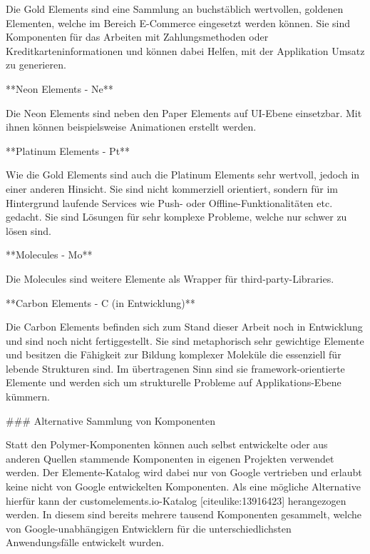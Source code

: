 Die Gold Elements sind eine Sammlung an buchstäblich wertvollen, goldenen Elementen, welche im Bereich E-Commerce eingesetzt werden können. Sie sind Komponenten für das Arbeiten mit Zahlungsmethoden oder Kreditkarteninformationen und können dabei Helfen, mit der Applikation Umsatz zu generieren.


**Neon Elements - Ne**

Die Neon Elements sind neben den Paper Elements auf UI-Ebene einsetzbar. Mit ihnen können beispielsweise Animationen erstellt werden.


**Platinum Elements - Pt**

Wie die Gold Elements sind auch die Platinum Elements sehr wertvoll, jedoch in einer anderen Hinsicht. Sie sind nicht kommerziell orientiert, sondern für im Hintergrund laufende Services wie Push- oder Offline-Funktionalitäten etc. gedacht. Sie sind Lösungen für sehr komplexe Probleme, welche nur schwer zu lösen sind.


**Molecules - Mo**

Die Molecules sind weitere Elemente als Wrapper für third-party-Libraries.


**Carbon Elements - C (in Entwicklung)**

Die Carbon Elements befinden sich zum Stand dieser Arbeit noch in Entwicklung und sind noch nicht fertiggestellt. Sie sind metaphorisch sehr gewichtige Elemente und besitzen die Fähigkeit zur Bildung komplexer Moleküle die essenziell für lebende Strukturen sind. Im übertragenen Sinn sind sie framework-orientierte Elemente und werden sich um strukturelle Probleme auf Applikations-Ebene kümmern.


### Alternative Sammlung von Komponenten

Statt den Polymer-Komponenten können auch selbst entwickelte oder aus anderen Quellen stammende Komponenten in eigenen Projekten verwendet werden. Der Elemente-Katalog wird dabei nur von Google vertrieben und erlaubt keine nicht von Google entwickelten Komponenten. Als eine mögliche Alternative hierfür kann der customelements.io-Katalog [citeulike:13916423] herangezogen werden. In diesem sind bereits mehrere tausend Komponenten gesammelt, welche von Google-unabhängigen Entwicklern für die unterschiedlichsten Anwendungsfälle entwickelt wurden.


\fi
